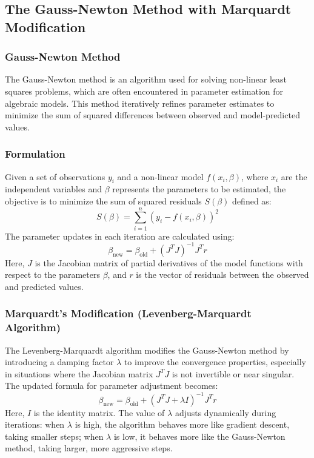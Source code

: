 \documentclass[12pt]{article} %
\begin{document}
\subsection{The Gauss-Newton Method with Marquardt Modification}

\subsubsection{Gauss-Newton Method}

The Gauss-Newton method is an algorithm used for solving non-linear least squares problems, which are often encountered in parameter estimation for algebraic models. This method iteratively refines parameter estimates to minimize the sum of squared differences between observed and model-predicted values.

\subsubsection{Formulation}
Given a set of observations $y_i$ and a non-linear model $f(x_i, \beta)$, where $x_i$ are the independent variables and $\beta$ represents the parameters to be estimated, the objective is to minimize the sum of squared residuals $S(\beta)$ defined as:
\[
S(\beta) = \sum_{i=1}^n \left(y_i - f(x_i, \beta)\right)^2
\]
The parameter updates in each iteration are calculated using:
\[
\beta_{\text{new}} = \beta_{\text{old}} + (J^T J)^{-1} J^T r
\]
Here, $J$ is the Jacobian matrix of partial derivatives of the model functions with respect to the parameters $\beta$, and $r$ is the vector of residuals between the observed and predicted values.

\subsubsection{Marquardt's Modification (Levenberg-Marquardt Algorithm)}

The Levenberg-Marquardt algorithm modifies the Gauss-Newton method by introducing a damping factor $\lambda$ to improve the convergence properties, especially in situations where the Jacobian matrix $J^T J$ is not invertible or near singular. The updated formula for parameter adjustment becomes:
\[
\beta_{\text{new}} = \beta_{\text{old}} + (J^T J + \lambda I)^{-1} J^T r
\]
Here, $I$ is the identity matrix. The value of $\lambda$ adjusts dynamically during iterations: when $\lambda$ is high, the algorithm behaves more like gradient descent, taking smaller steps; when $\lambda$ is low, it behaves more like the Gauss-Newton method, taking larger, more aggressive steps.
\end{document}
